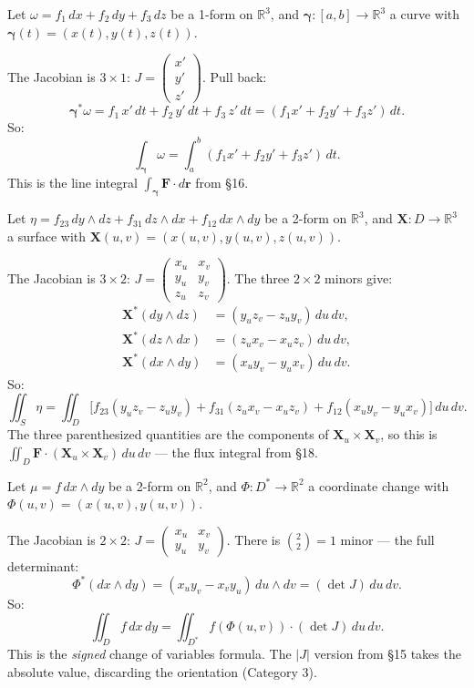 \documentclass[11pt]{report}
\newcommand{\R}{\mathbb{R}}
\begin{document}
\begin{example}
Let $\omega = f_1\,dx + f_2\,dy + f_3\,dz$ be a 1-form on $\R^3$, and $\boldsymbol{\gamma}: [a,b] \to \R^3$ a curve with $\boldsymbol{\gamma}(t) = (x(t), y(t), z(t))$.

The Jacobian is $3 \times 1$: $J = \begin{pmatrix} x' \\ y' \\ z' \end{pmatrix}$. Pull back:
\[
\boldsymbol{\gamma}^*\omega = f_1\,x'\,dt + f_2\,y'\,dt + f_3\,z'\,dt = (f_1 x' + f_2 y' + f_3 z')\,dt.
\]
So:
\[
\int_{\boldsymbol{\gamma}} \omega = \int_a^b (f_1 x' + f_2 y' + f_3 z')\,dt.
\]
This is the line integral $\int_{\boldsymbol{\gamma}} \mathbf{F} \cdot d\mathbf{r}$ from \S16.
\end{example}

\begin{example}
Let $\eta = f_{23}\,dy \wedge dz + f_{31}\,dz \wedge dx + f_{12}\,dx \wedge dy$ be a 2-form on $\R^3$, and $\mathbf{X}: D \to \R^3$ a surface with $\mathbf{X}(u,v) = (x(u,v), y(u,v), z(u,v))$.

The Jacobian is $3 \times 2$: $J = \begin{pmatrix} x_u & x_v \\ y_u & y_v \\ z_u & z_v \end{pmatrix}$. The three $2 \times 2$ minors give:
\begin{align*}
\mathbf{X}^*(dy \wedge dz) &= (y_u z_v - z_u y_v)\,du\,dv, \\
\mathbf{X}^*(dz \wedge dx) &= (z_u x_v - x_u z_v)\,du\,dv, \\
\mathbf{X}^*(dx \wedge dy) &= (x_u y_v - y_u x_v)\,du\,dv.
\end{align*}
So:
\[
\iint_S \eta = \iint_D \big[f_{23}(y_u z_v - z_u y_v) + f_{31}(z_u x_v - x_u z_v) + f_{12}(x_u y_v - y_u x_v)\big]\,du\,dv.
\]
The three parenthesized quantities are the components of $\mathbf{X}_u \times \mathbf{X}_v$, so this is $\iint_D \mathbf{F} \cdot (\mathbf{X}_u \times \mathbf{X}_v)\,du\,dv$ --- the flux integral from \S18.
\end{example}

\begin{example}
Let $\mu = f\,dx \wedge dy$ be a 2-form on $\R^2$, and $\Phi: D^* \to \R^2$ a coordinate change with $\Phi(u,v) = (x(u,v), y(u,v))$.

The Jacobian is $2 \times 2$: $J = \begin{pmatrix} x_u & x_v \\ y_u & y_v \end{pmatrix}$. There is $\binom{2}{2} = 1$ minor --- the full determinant:
\[
\Phi^*(dx \wedge dy) = (x_u y_v - x_v y_u)\,du \wedge dv = (\det J)\,du\,dv.
\]
So:
\[
\iint_D f\,dx\,dy = \iint_{D^*} f(\Phi(u,v)) \cdot (\det J)\,du\,dv.
\]
This is the \textit{signed} change of variables formula. The $|J|$ version from \S15 takes the absolute value, discarding the orientation (Category 3).
\end{example}
\end{document}
